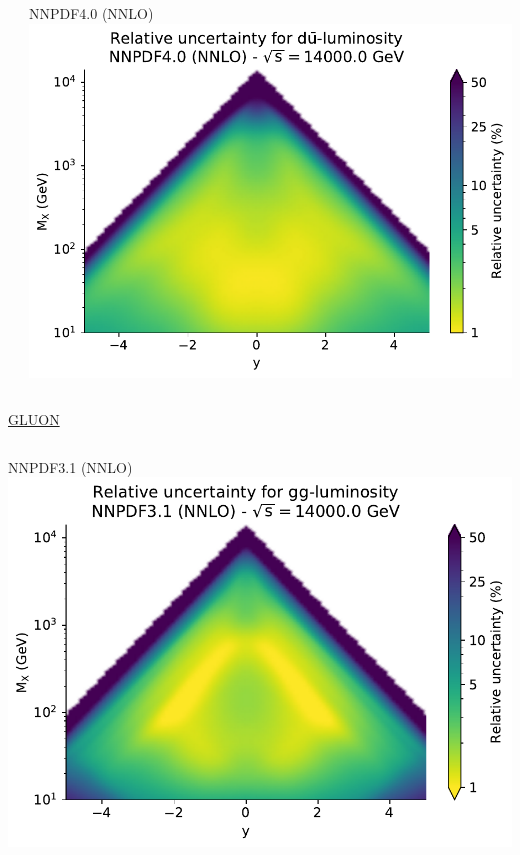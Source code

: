 \documentclass{beamer}
\begin{document}
\begin{frame}
\begin{overlayarea}{\textwidth}{5.2cm}
{\begin{columns}[c]
\begin{column}{0.5\textwidth}
   \end{column}
   \begin{column}{0.5\textwidth}
    \centering
        NNPDF4.0 (NNLO)\\
        \vspace{0.1cm}
        \includegraphics[width=\columnwidth]{plots/plot_lumi2d_uncertainty_NNPDF40_dubar}\\    
   \end{column}
  \end{columns}  
  }   
  {
  \centering
  \underline{GLUON}\\
  \begin{columns}[c]
   \begin{column}{0.5\textwidth}
    \centering
        NNPDF3.1 (NNLO)\\
        \vspace{0.1cm}
        \includegraphics[width=\columnwidth]{plots/plot_lumi2d_uncertainty_NNPDF31_gg}\\

\end{column}
\end{columns}}
\end{overlayarea}
\end{frame}
\end{document}
